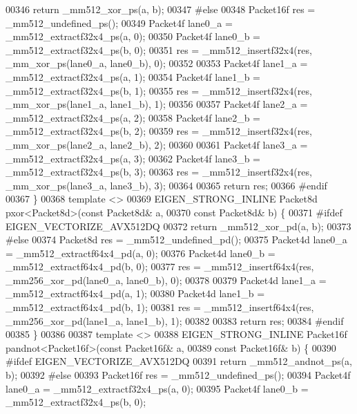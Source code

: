\begin{DoxyCode}
00346   \textcolor{keywordflow}{return} \_mm512\_xor\_ps(a, b);
00347 \textcolor{preprocessor}{#else}
00348   Packet16f res = \_mm512\_undefined\_ps();
00349   Packet4f lane0\_a = \_mm512\_extractf32x4\_ps(a, 0);
00350   Packet4f lane0\_b = \_mm512\_extractf32x4\_ps(b, 0);
00351   res = \_mm512\_insertf32x4(res, \_mm\_xor\_ps(lane0\_a, lane0\_b), 0);
00352 
00353   Packet4f lane1\_a = \_mm512\_extractf32x4\_ps(a, 1);
00354   Packet4f lane1\_b = \_mm512\_extractf32x4\_ps(b, 1);
00355   res = \_mm512\_insertf32x4(res, \_mm\_xor\_ps(lane1\_a, lane1\_b), 1);
00356 
00357   Packet4f lane2\_a = \_mm512\_extractf32x4\_ps(a, 2);
00358   Packet4f lane2\_b = \_mm512\_extractf32x4\_ps(b, 2);
00359   res = \_mm512\_insertf32x4(res, \_mm\_xor\_ps(lane2\_a, lane2\_b), 2);
00360 
00361   Packet4f lane3\_a = \_mm512\_extractf32x4\_ps(a, 3);
00362   Packet4f lane3\_b = \_mm512\_extractf32x4\_ps(b, 3);
00363   res = \_mm512\_insertf32x4(res, \_mm\_xor\_ps(lane3\_a, lane3\_b), 3);
00364 
00365   \textcolor{keywordflow}{return} res;
00366 \textcolor{preprocessor}{#endif}
00367 \}
00368 \textcolor{keyword}{template} <>
00369 EIGEN\_STRONG\_INLINE Packet8d pxor<Packet8d>(\textcolor{keyword}{const} Packet8d& a,
00370                                             \textcolor{keyword}{const} Packet8d& b) \{
00371 \textcolor{preprocessor}{#ifdef EIGEN\_VECTORIZE\_AVX512DQ}
00372   \textcolor{keywordflow}{return} \_mm512\_xor\_pd(a, b);
00373 \textcolor{preprocessor}{#else}
00374   Packet8d res = \_mm512\_undefined\_pd();
00375   Packet4d lane0\_a = \_mm512\_extractf64x4\_pd(a, 0);
00376   Packet4d lane0\_b = \_mm512\_extractf64x4\_pd(b, 0);
00377   res = \_mm512\_insertf64x4(res, \_mm256\_xor\_pd(lane0\_a, lane0\_b), 0);
00378 
00379   Packet4d lane1\_a = \_mm512\_extractf64x4\_pd(a, 1);
00380   Packet4d lane1\_b = \_mm512\_extractf64x4\_pd(b, 1);
00381   res = \_mm512\_insertf64x4(res, \_mm256\_xor\_pd(lane1\_a, lane1\_b), 1);
00382 
00383   \textcolor{keywordflow}{return} res;
00384 \textcolor{preprocessor}{#endif}
00385 \}
00386 
00387 \textcolor{keyword}{template} <>
00388 EIGEN\_STRONG\_INLINE Packet16f pandnot<Packet16f>(\textcolor{keyword}{const} Packet16f& a,
00389                                                  \textcolor{keyword}{const} Packet16f& b) \{
00390 \textcolor{preprocessor}{#ifdef EIGEN\_VECTORIZE\_AVX512DQ}
00391   \textcolor{keywordflow}{return} \_mm512\_andnot\_ps(a, b);
00392 \textcolor{preprocessor}{#else}
00393   Packet16f res = \_mm512\_undefined\_ps();
00394   Packet4f lane0\_a = \_mm512\_extractf32x4\_ps(a, 0);
00395   Packet4f lane0\_b = \_mm512\_extractf32x4\_ps(b, 0);

\end{DoxyCode}
